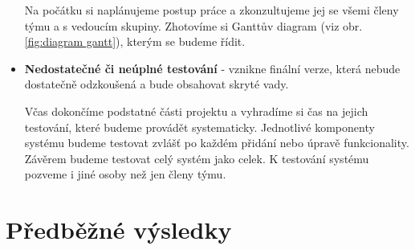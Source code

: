 \documentclass[12pt,a4paper]{article}
\begin{document}
\begin{itemize}
	Na počátku si naplánujeme postup práce a zkonzultujeme jej se všemi členy týmu a s vedoucím skupiny. Zhotovíme si Ganttův diagram (viz obr. \ref{fig:diagram gantt}), kterým se budeme řídit.
	
	\item{\textbf{Nedostatečné či neúplné testování}} - vznikne finální verze, která nebude dostatečně odzkoušená a bude obsahovat skryté vady.
	
	Včas dokončíme podstatné části projektu a vyhradíme si čas na jejich testování, které budeme provádět systematicky. Jednotlivé komponenty systému budeme testovat zvlášť po každém přidání nebo úpravě funkcionality. Závěrem budeme testovat celý systém jako celek. K testování systému pozveme i jiné osoby než jen členy týmu. 
	
	 
	
\end{itemize}



\section*{Předběžné výsledky}


\nocite{*}
\printbibliography 
\end{document}
